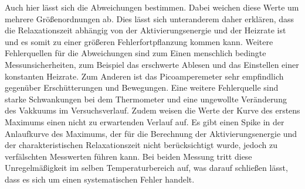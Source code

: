Auch hier lässt sich die Abweichungen bestimmen. Dabei weichen diese Werte um mehrere
Größenordnungen ab. Dies lässt sich unteranderem daher erklären, dass die Relaxationszeit abhängig von
der Aktivierungsenergie und der Heizrate ist und es somit zu einer größeren Fehlerfortpflanzung kommen kann.
Weitere Fehlerquellen für die Abweichungen sind zum Einen menschlich bedingte Messunsicherheiten, zum Beispiel
das erschwerte Ablesen und das Einstellen einer konstanten Heizrate. Zum Anderen ist das Picoamperemeter
sehr empfindlich gegenüber Erschütterungen und Bewegungen.
Eine weitere Fehlerquelle sind starke Schwankungen bei dem Thermometer und eine ungewollte Veränderung 
des Vakkuums im Versuchsverlauf. Zudem weisen die Werte der Kurve des erstens Maximums einen nicht zu erwartenden Verlauf auf.
Es gibt einen Spike in der Anlaufkurve des Maximums, der für die Berechnung der Aktivierungsenergie und der
charakteristischen Relaxationszeit nicht berücksichtigt wurde, jedoch zu verfälschten Messwerten führen kann.
Bei beiden Messung tritt diese Unregelmäßigkeit im selben Temperaturbereich auf, was darauf schließen lässt,
dass es sich um einen systematischen Fehler handelt.